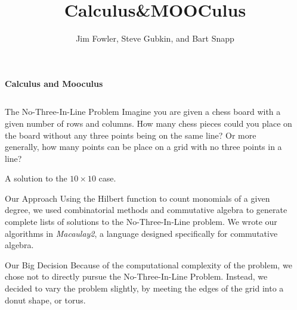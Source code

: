\documentclass[12pt,serif,mathserif,final]{beamer}
\title{Calculus\&\textsf{MOOCulus}}
\author{Jim Fowler, Steve Gubkin, and Bart Snapp}
\institute{The Ohio State University}
\begin{document}
\begin{frame}[t]
    \vspace{6cm}
    \huge \textbf{Calculus and Mooculus} \normalsize
    \vspace{5cm}
  \begin{columns}[t]

    \begin{column}{0.32\linewidth}
    
      \begin{block}{The No-Three-In-Line Problem}
        Imagine you are given a chess board with a given number of rows
        and columns.  How many chess pieces could you place on the board
        without any three points being on the same line?  Or more generally,
        how many points can be place on a grid with no three points in a line?
        \begin{center}

            A solution to the $10\times 10$ case.
        \end{center}
      \end{block}

      \begin{block}{Our Approach}
        Using the Hilbert function to count monomials of a given degree,
        we used combinatorial methods and commutative algebra to generate 
        complete lists of solutions to the No-Three-In-Line problem.  We 
        wrote our algorithms in \textit{Macaulay2}, a language designed specifically
        for commutative algebra.
      \end{block}

      \begin{block}{Our Big Decision}
        Because of the computational complexity of the problem, we chose not
        to directly pursue the No-Three-In-Line Problem.  Instead, we decided
        to vary the problem slightly, by meeting the edges of the grid into a
        donut shape, or torus.
      \end{block}

    \end{column}%

    \begin{column}{0.32\linewidth}


\end{column}
\end{columns}
\end{frame}
\end{document}
